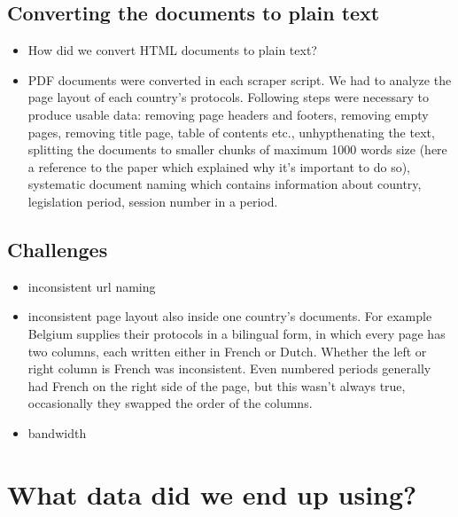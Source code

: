 \documentclass[
  12pt,
]{scrreprt}
\providecommand{\tightlist}{%
  \setlength{\itemsep}{0pt}\setlength{\parskip}{0pt}}
\begin{document}
\hypertarget{converting-the-documents-to-plain-text}{%
\subsection{Converting the documents to plain
text}\label{converting-the-documents-to-plain-text}}

\begin{itemize}
\tightlist
\item
  How did we convert HTML documents to plain text?
\item
  PDF documents were converted in each scraper script. We had to analyze
  the page layout of each country's protocols. Following steps were
  necessary to produce usable data: removing page headers and footers,
  removing empty pages, removing title page, table of contents etc.,
  unhypthenating the text, splitting the documents to smaller chunks of
  maximum 1000 words size (here a reference to the paper which explained
  why it's important to do so), systematic document naming which
  contains information about country, legislation period, session number
  in a period.
\end{itemize}

\hypertarget{challenges}{%
\subsection{Challenges}\label{challenges}}

\begin{itemize}
\tightlist
\item
  inconsistent url naming
\item
  inconsistent page layout also inside one country's documents. For
  example Belgium supplies their protocols in a bilingual form, in which
  every page has two columns, each written either in French or Dutch.
  Whether the left or right column is French was inconsistent. Even
  numbered periods generally had French on the right side of the page,
  but this wasn't always true, occasionally they swapped the order of
  the columns.
\item
  bandwidth
\end{itemize}

\hypertarget{what-data-did-we-end-up-using}{%
\section{What data did we end up
using?}\label{what-data-did-we-end-up-using}}
\end{document}
